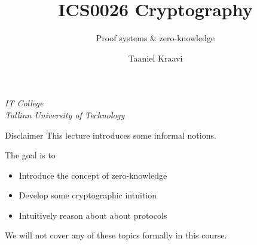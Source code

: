 

\usepackage[dvipsnames]{xcolor}

\usepackage{booktabs}

\usepackage{fancyvrb}

\usepackage{csquotes}

\usepackage{graphicx}
\graphicspath{ {../../images/} }

\usepackage{pgfplots}
\usetikzlibrary{positioning,calc,external}

\usepackage{crysymb}

\renewcommand*{\arraystretch}{1.2}

\usepackage{soul}
\usepackage[en-GB]{datetime2}

\usetikzlibrary{positioning,calc}
\graphicspath{ {../../images/} }

\title{ICS0026 Cryptography}
\subtitle{Proof systems \& zero-knowledge}
\date{}
\author{Taaniel Kraavi}
\institute%
{%
  \textit{IT College}\\
  \textit{Tallinn University of Technology}
}


\begin{frame}
  \titlepage
\end{frame}

\begin{frame}{Disclaimer}
  \pause
  This lecture introduces some informal notions.

  \pause
  The goal is to
  \begin{itemize}[<+(1)->]
    \item Introduce the concept of zero-knowledge
    \item Develop some cryptographic intuition
    \item Intuitively reason about about protocols
  \end{itemize}

  \vfill

  \pause
  We will not cover any of these topics formally in this course.
\end{frame}

